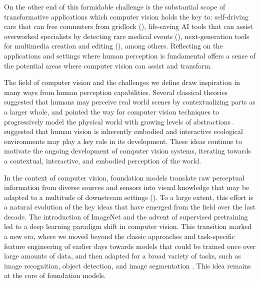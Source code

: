 On the other end of this formidable challenge is the substantial scope of transformative applications which computer vision holds the key to: self-driving cars that can free commuters from gridlock (), life-saving AI tools that can assist overworked specialists by detecting rare medical events (), next-generation tools for multimedia creation and editing (), among others. Reflecting on the applications and settings where human perception is fundamental offers a sense of the potential areas where computer vision can assist and transform.

The field of computer vision and the challenges we define draw inspiration in many ways from human perception capabilities.
Several classical theories \citep[\eg][]{biederman_perceiving_1972,mcclelland1981interactive,marr1982vision} suggested that humans may perceive real world scenes by contextualizing parts as a larger whole, and pointed the way for computer vision techniques to progressively model the physical world with growing levels of abstractions \cite{lowe1992robust,girshick2014rich}.
\citet{gibson1979ecological} suggested that human vision is inherently embodied and interactive ecological environments may play a key role in its development.
These ideas continue to motivate the ongoing development of computer vision systems, iterating towards a contextual, interactive, and embodied perception of the world.

In the context of computer vision, foundation models translate raw perceptual information from diverse sources and sensors into visual knowledge that may be adapted to a multitude of downstream settings (). To a large extent, this effort is a natural evolution of the key ideas that have emerged from the field over the last decade.
The introduction of ImageNet \cite{deng2009imagenet} and the advent of supervised pretraining led to a deep learning paradigm shift in computer vision. This transition marked a new era, where we moved beyond the classic approaches and task-specific feature engineering of earlier days \cite{lowe2004distinctive, bay2006surf, rosten2006machine} towards models that could be trained once over large amounts of data, and then adapted for a broad variety of tasks, such as image recognition, object detection, and image segmentation \cite{krizhevsky2012imagenet, szegedy2015going, he2016deep, simonyan2015verydeep}. This idea remains at the core of foundation models.

